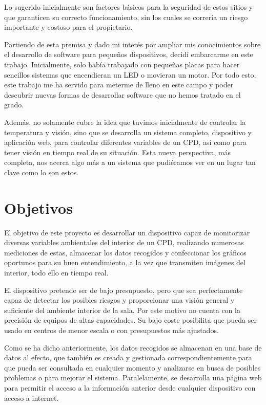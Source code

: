 Lo sugerido inicialmente son factores básicos para la seguridad de estos sitios y que garanticen su correcto funcionamiento, sin los cuales se correría un riesgo importante y costoso para el propietario.

Partiendo de esta premisa y dado mi interés por ampliar mis conocimientos sobre el desarrollo de software para pequeños dispositivos, decidí embarcarme en este trabajo. Inicialmente, solo había trabajado con pequeñas placas para hacer sencillos sistemas que encendieran un LED o movieran un motor. Por todo esto, este trabajo me ha servido para meterme de lleno en este campo y poder descubrir nuevas formas de desarrollar software que no hemos tratado en el grado.

Además, no solamente cubre la idea que tuvimos inicialmente de controlar la temperatura y visión, sino que se desarrolla un sistema completo, dispositivo y aplicación web, para controlar diferentes variables de un CPD, así como para tener visión en tiempo real de su situación. Esta nueva perspectiva, más completa, nos acerca algo más a un sistema que pudiéramos ver en un lugar tan clave como lo son estos.

\section{Objetivos}\label{sec:objetivos}
El objetivo de este proyecto es desarrollar un dispositivo capaz de monitorizar diversas variables ambientales del interior de un CPD, realizando numerosas mediciones de estas, almacenar los datos recogidos y confeccionar los gráficos oportunos para su buen entendimiento, a la vez que transmiten imágenes del interior, todo ello en tiempo real.

El dispositivo pretende ser de bajo presupuesto, pero que sea perfectamente capaz de detectar los posibles riesgos y proporcionar una visión general y suficiente del ambiente interior de la sala. Por este motivo no cuenta con la precisión de equipos de altas capacidades. Su bajo coste posibilita que pueda ser usado en centros de menor escala o con presupuestos más ajustados.

Como se ha dicho anteriormente, los datos recogidos se almacenan en una base de datos al efecto, que también es creada y gestionada correspondientemente para que pueda ser consultada en cualquier momento y analizarse en busca de posibles problemas o para mejorar el sistema. Paralelamente, se desarrolla una página web para permitir el acceso a la información anterior desde cualquier dispositivo con acceso a internet.

